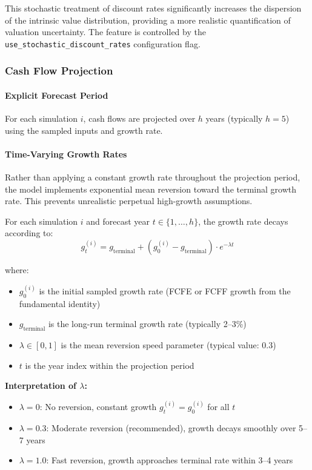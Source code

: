 This stochastic treatment of discount rates significantly increases the dispersion of the intrinsic value distribution, providing a more realistic quantification of valuation uncertainty. The feature is controlled by the \texttt{use\_stochastic\_discount\_rates} configuration flag.

\subsubsection{Cash Flow Projection}

\paragraph{Explicit Forecast Period}

For each simulation $i$, cash flows are projected over $h$ years (typically $h = 5$) using the sampled inputs and growth rate.

\paragraph{Time-Varying Growth Rates}

Rather than applying a constant growth rate throughout the projection period, the model implements exponential mean reversion toward the terminal growth rate. This prevents unrealistic perpetual high-growth assumptions.

For each simulation $i$ and forecast year $t \in \{1, \ldots, h\}$, the growth rate decays according to:
\[
g_t^{(i)} = g_{\text{terminal}} + \left(g_0^{(i)} - g_{\text{terminal}}\right) \cdot e^{-\lambda t}
\]

where:
\begin{itemize}
  \item $g_0^{(i)}$ is the initial sampled growth rate (FCFE or FCFF growth from the fundamental identity)
  \item $g_{\text{terminal}}$ is the long-run terminal growth rate (typically 2--3\%)
  \item $\lambda \in [0, 1]$ is the mean reversion speed parameter (typical value: 0.3)
  \item $t$ is the year index within the projection period
\end{itemize}

\textbf{Interpretation of $\lambda$:}
\begin{itemize}
  \item $\lambda = 0$: No reversion, constant growth $g_t^{(i)} = g_0^{(i)}$ for all $t$
  \item $\lambda = 0.3$: Moderate reversion (recommended), growth decays smoothly over 5--7 years
  \item $\lambda = 1.0$: Fast reversion, growth approaches terminal rate within 3--4 years
\end{itemize}

